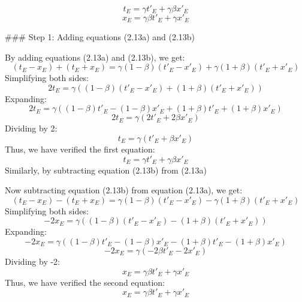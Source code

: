 \documentclass[12pt]{article}
\begin{document}
\[
t_E = \gamma t'_E + \gamma \beta x'_E
\]
\[
x_E = \gamma \beta t'_E + \gamma x'_E
\]

### Step 1: Adding equations (2.13a) and (2.13b)

By adding equations (2.13a) and (2.13b), we get:
\[
(t_E - x_E) + (t_E + x_E) = \gamma (1 - \beta)(t'_E - x'_E) + \gamma (1 + \beta)(t'_E + x'_E)
\]
Simplifying both sides:
\[
2t_E = \gamma \left( (1 - \beta)(t'_E - x'_E) + (1 + \beta)(t'_E + x'_E) \right)
\]
Expanding:
\[
2t_E = \gamma \left( (1 - \beta)t'_E - (1 - \beta)x'_E + (1 + \beta)t'_E + (1 + \beta)x'_E \right)
\]
\[
2t_E = \gamma \left( 2t'_E + 2\beta x'_E \right)
\]
Dividing by 2:
\[
t_E = \gamma (t'_E + \beta x'_E)
\]
Thus, we have verified the first equation:
\[
t_E = \gamma t'_E + \gamma \beta x'_E
\]
Similarly, by subtracting equation (2.13b) from (2.13a)

Now subtracting equation (2.13b) from equation (2.13a), we get:
\[
(t_E - x_E) - (t_E + x_E) = \gamma (1 - \beta)(t'_E - x'_E) - \gamma (1 + \beta)(t'_E + x'_E)
\]
Simplifying both sides:
\[
-2x_E = \gamma \left( (1 - \beta)(t'_E - x'_E) - (1 + \beta)(t'_E + x'_E) \right)
\]
Expanding:
\[
-2x_E = \gamma \left( (1 - \beta)t'_E - (1 - \beta)x'_E - (1 + \beta)t'_E - (1 + \beta)x'_E \right)
\]
\[
-2x_E = \gamma \left( -2\beta t'_E - 2x'_E \right)
\]
Dividing by -2:
\[
x_E = \gamma \beta t'_E + \gamma x'_E
\]
Thus, we have verified the second equation:
\[
x_E = \gamma \beta t'_E + \gamma x'_E
\]
\end{document}
